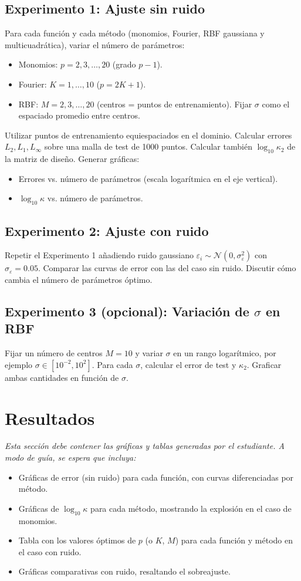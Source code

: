 \subsection{Experimento 1: Ajuste sin ruido}
Para cada función y cada método (monomios, Fourier, RBF gaussiana y multicuadrática), variar el número de parámetros:
\begin{itemize}
  \item Monomios: \(p = 2,3,\dots,20\) (grado \(p-1\)).
  \item Fourier: \(K = 1,\dots,10\) (\(p = 2K+1\)).
  \item RBF: \(M = 2,3,\dots,20\) (centros = puntos de entrenamiento). Fijar \(\sigma\) como el espaciado promedio entre centros.
\end{itemize}
Utilizar puntos de entrenamiento equiespaciados en el dominio. Calcular errores \(L_2, L_1, L_\infty\) sobre una malla de test de 1000 puntos. Calcular también \(\log_{10}\kappa_2\) de la matriz de diseño. Generar gráficas:
\begin{itemize}
  \item Errores vs. número de parámetros (escala logarítmica en el eje vertical).
  \item \(\log_{10}\kappa\) vs. número de parámetros.
\end{itemize}

\subsection{Experimento 2: Ajuste con ruido}
Repetir el Experimento 1 añadiendo ruido gaussiano \(\varepsilon_i \sim \mathcal{N}(0, \sigma_\varepsilon^2)\) con \(\sigma_\varepsilon = 0.05\). Comparar las curvas de error con las del caso sin ruido. Discutir cómo cambia el número de parámetros óptimo.

\subsection{Experimento 3 (opcional): Variación de \(\sigma\) en RBF}
Fijar un número de centros \(M = 10\) y variar \(\sigma\) en un rango logarítmico, por ejemplo \(\sigma \in [10^{-2}, 10^{2}]\). Para cada \(\sigma\), calcular el error de test y \(\kappa_2\). Graficar ambas cantidades en función de \(\sigma\).

\section{Resultados}
\textit{Esta sección debe contener las gráficas y tablas generadas por el estudiante. A modo de guía, se espera que incluya:}
\begin{itemize}
  \item Gráficas de error (sin ruido) para cada función, con curvas diferenciadas por método.
  \item Gráficas de \(\log_{10}\kappa\) para cada método, mostrando la explosión en el caso de monomios.
  \item Tabla con los valores óptimos de \(p\) (o \(K\), \(M\)) para cada función y método en el caso con ruido.
  \item Gráficas comparativas con ruido, resaltando el sobreajuste.
\end{itemize}

